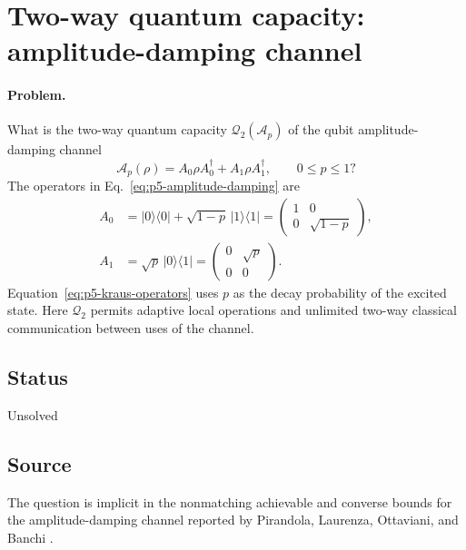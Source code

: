 \section{Two-way quantum capacity: amplitude-damping channel}
\label{sec:problem-5}

\paragraph{Problem.}
What is the two-way quantum capacity $\mathcal{Q}_2(\mathcal A_p)$ of the
qubit amplitude-damping channel
\begin{equation}
  \mathcal A_p(\rho)=A_0\rho A_0^\dagger+A_1\rho A_1^\dagger,
  \qquad 0\le p\le1?
  \label{eq:p5-amplitude-damping}
\end{equation}
The operators in Eq.~\eqref{eq:p5-amplitude-damping} are
\begin{equation}
  \begin{aligned}
    A_0&=\lvert0\rangle\!\langle0\rvert
         +\sqrt{1-p}\,\lvert1\rangle\!\langle1\rvert
       =\begin{pmatrix}1&0\\0&\sqrt{1-p}\end{pmatrix},\\
    A_1&=\sqrt p\,\lvert0\rangle\!\langle1\rvert
       =\begin{pmatrix}0&\sqrt p\\0&0\end{pmatrix}.
  \end{aligned}
  \label{eq:p5-kraus-operators}
\end{equation}
Equation~\eqref{eq:p5-kraus-operators} uses $p$ as the decay probability of
the excited state.  Here $\mathcal{Q}_2$ permits adaptive local operations and
unlimited two-way classical communication between uses of the channel.

\subsection*{Status}

Unsolved

\subsection*{Source}

The question is implicit in the nonmatching achievable and converse bounds
for the amplitude-damping channel reported by Pirandola, Laurenza,
Ottaviani, and Banchi .

